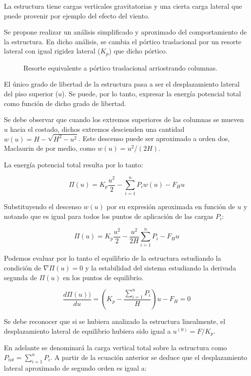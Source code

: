 La estructura tiene cargas verticales gravitatorias y una cierta carga lateral que puede provenir por ejemplo del efecto del viento.

Se propone realizar un análisis simplificado y aproximado del comportamiento de la estructura. En dicho análisis, se cambia el pórtico traslacional por un resorte lateral con igual rigidez lateral ($K_{p}$) que dicho pórtico.

\begin{figure}[htb]
  \centering
  \def\svgwidth{0.6\textwidth}
  
	\caption{Resorte equivalente a pórtico traslacional arriostrando columnas.}
	\label{fig:globales2}
\end{figure}

El único grado de libertad de la estructura pasa a ser el desplazamiento lateral del piso superior ($u$). Se puede, por lo tanto, expresar la energía potencial total como función de dicho grado de libertad.

Se debe observar que cuando los extremos superiores de las columnas se mueven $u$ hacia el costado, dichos extremos descienden una cantidad $w(u)=H-\sqrt{H^2-u^2}$. Este descenso puede ser aproximado a orden dos, Maclaurin de por medio, como $w(u)=u^2/(2H)$.

La energía potencial total resulta por lo tanto:

$$\Pi(u)=K_p \frac{u^2}{2} -\sum_{i=1}^n P_i w(u) - F_H u$$

Substituyendo el descenso $w(u)$ por su expresión aproximada en función de $u$ y notando que es igual para todos los puntos de aplicación de las cargas $P_i$:

$$\Pi(u)=K_p \frac{u^2}{2} -\frac {u^2}{2H} \sum_{i=1}^n P_i - F_H u$$

Podemos evaluar por lo tanto el equilibrio de la estructura estudiando la condición de $\nabla \Pi(u)=0$ y la estabilidad del sistema estudiando la derivada segunda de $\Pi(u)$ en los puntos de equilibrio.

$$\frac{d \Pi(u))}{d u} = \left(K_p-\frac{\sum_{i=1}^n P_i}{H}\right)u - F_H = 0$$

Se debe reconocer que si se hubiera analizado la estructura linealmente, el desplazamiento lateral de equilibrio hubiera sido igual a $u^{(0)}=F/K_p$.

En adelante se denominará la carga vertical total sobre la estructura como $P_{tot}=\sum_{i=1}^n P_i$. A partir de la ecuación anterior se deduce que el desplazamiento lateral aproximado de segundo orden es igual a:

